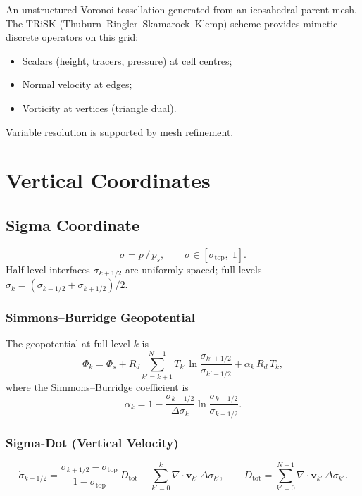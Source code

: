 \documentclass[11pt,twoside]{report}
\newcommand{\Rd}{R_d}
\newcommand{\vect}[1]{\bm{#1}}
\newcommand{\divg}{\nabla\!\cdot\!}
\begin{document}
An unstructured Voronoi tessellation generated from an icosahedral parent
mesh.  The TRiSK (Thuburn--Ringler--Skamarock--Klemp) scheme provides
mimetic discrete operators on this grid:
\begin{itemize}[nosep]
  \item Scalars (height, tracers, pressure) at cell centres;
  \item Normal velocity at edges;
  \item Vorticity at vertices (triangle dual).
\end{itemize}
Variable resolution is supported by mesh refinement.


\section{Vertical Coordinates}
\label{sec:vertical}

\subsection{Sigma Coordinate}
\begin{equation}
  \sigma = p\,/\,p_s, \qquad \sigma\in[\sigma_{\mathrm{top}},\;1].
\end{equation}
Half-level interfaces $\sigma_{k+1/2}$ are uniformly spaced; full levels
$\sigma_k=(\sigma_{k-1/2}+\sigma_{k+1/2})/2$.

\subsubsection{Simmons--Burridge Geopotential}

The geopotential at full level $k$ is
\begin{equation}
  \Phi_k = \Phi_s + \Rd\!\sum_{k'=k+1}^{N-1}T_{k'}\ln\frac{\sigma_{k'+1/2}}{\sigma_{k'-1/2}}
  + \alpha_k\,\Rd\,T_k,
\end{equation}
where the Simmons--Burridge coefficient is
\begin{equation}
  \alpha_k = 1 - \frac{\sigma_{k-1/2}}{\Delta\sigma_k}
  \ln\frac{\sigma_{k+1/2}}{\sigma_{k-1/2}}.
\end{equation}

\subsubsection{Sigma-Dot (Vertical Velocity)}
\begin{equation}
  \dot\sigma_{k+1/2} =
  \frac{\sigma_{k+1/2}-\sigma_{\mathrm{top}}}{1-\sigma_{\mathrm{top}}}
  \,D_{\mathrm{tot}}
  - \sum_{k'=0}^{k}\divg\vect{v}_{k'}\,\Delta\sigma_{k'},
  \qquad D_{\mathrm{tot}}=\sum_{k'=0}^{N-1}\divg\vect{v}_{k'}\,\Delta\sigma_{k'}.
\end{equation}
\end{document}

